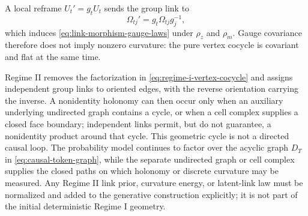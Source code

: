 A local reframe $U_t'=g_tU_t$ sends the group link to
\begin{equation}
\Omega_{tj}'=g_t\Omega_{tj}g_j^{-1},
\label{eq:group-link-gauge-law}
\end{equation}
which induces \cref{eq:link-morphism-gauge-laws} under $\rho_z$ and $\rho_m$.  Gauge covariance therefore does not imply nonzero curvature: the pure vertex cocycle is covariant and flat at the same time.

Regime II removes the factorization in \cref{eq:regime-i-vertex-cocycle} and assigns independent group links to oriented edges, with the reverse orientation carrying the inverse.  A nonidentity holonomy can then occur only when an auxiliary underlying undirected graph contains a cycle, or when a cell complex supplies a closed face boundary; independent links permit, but do not guarantee, a nonidentity product around that cycle.  This geometric cycle is not a directed causal loop.  The probability model continues to factor over the acyclic graph $D_T$ in \cref{eq:causal-token-graph}, while the separate undirected graph or cell complex supplies the closed paths on which holonomy or discrete curvature may be measured.  Any Regime II link prior, curvature energy, or latent-link law must be normalized and added to the generative construction explicitly; it is not part of the initial deterministic Regime I geometry.
